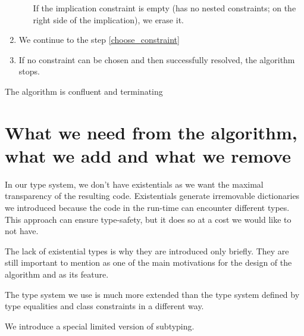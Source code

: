 \begin{defn}
\begin{enumerate}
\begin{itemize}
            If the implication constraint is empty (has no nested constraints; on the right side of the implication), we erase it.
            
        \end{itemize}
        \item We continue to the step \ref{choose_constraint}

        \item \label{false_constraint} If no constraint can be chosen and then successfully resolved, the algorithm stops.
    \end{enumerate}
\end{defn}

The algorithm is confluent and terminating 



\section{What we need from the algorithm, what we add and what we remove}

In our type system, we don't have existentials as we want the maximal transparency of the resulting code. Existentials generate irremovable dictionaries we introduced  because the code in the run-time can encounter different types. This approach can ensure type-safety, but it does so at a cost we would like to not have. 

The lack of existential types is why they are introduced only briefly. They are still important to mention as one of the main motivations for the design of the algorithm and as its feature.

The type system we use is much more extended than the type system defined by type equalities and class constraints in a different way.

We introduce a special limited version of subtyping.
